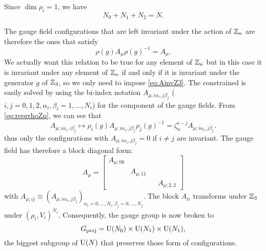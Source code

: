            Since $\dim\rho_i=1$, we have
            \begin{equation}
                N_0+N_1+N_2=N.\label{eq:sumNiZ3}
            \end{equation} 
            
            The gauge field configurations that are left invariant under the action of $\mathbb{Z}_n$ are therefore the ones that satisfy
            \begin{equation}
                \rho(g)A_\mu\rho(g)^{-1}=A_\mu.\label{eq:AinvZ3}
            \end{equation}
            We actually want this relation to be true for any element of $\mathbb{Z}_n$ but in this case it is invariant under any element of $\mathbb{Z}_n$ if and only if it is invariant under the generator $g$ of $\mathbb{Z}_3$, so we only need to impose \eqref{eq:AinvZ3}. The constrained is easily solved by using the bi-index notation $A_{\mu;i\alpha_i,j\beta_j}$ ($i,j=0,1,2,\alpha_i,\beta_i=1,\dots,N_i$) for the component of the gauge fields. From \eqref{eq:reprrhoZn}, we can see that
            \begin{equation}
                A_{\mu;i\alpha_i,i\beta_j}\mapsto \rho_i(g)A_{\mu;i\alpha_i,j\beta_j}\rho_j(g)^{-1}=\zeta^{i-j}_nA_{\mu;i\alpha_i,j\beta_j}.
            \end{equation}
            thus only the configurations with $A_{\mu;i\alpha_i,j\beta_j}=0$ if $i\neq j$ are invariant. The gauge field has therefore a block diagonal form:
            \begin{equation}
                A_\mu=
                \begin{bmatrix}
                    A_{\mu;00} & & \\
                    & A_{\mu;11} & \\
                    & & & A_{\mu;2,2}
                \end{bmatrix}
            \end{equation}
            with $A_{\mu;ij}\equiv (A_{\mu;i\alpha_i,j\beta_j})_{\alpha_i=0,\dots,N_i,\beta_j=0,\dots,N_j}$. The block $A_{ii}$ transforms under $\mathbb{Z}_3$ under $(\rho_i,V_i)^{N_i}$.
            Consequently, the gauge group is now broken to
            \begin{equation}
                G_{\text{proj}}=\text{U}(N_0)\times\text{U}(N_1)\times\text{U}(N_1),
            \end{equation}
            the biggest subgroup of $\text{U}(N)$ that preserves those form of configurations.
            
